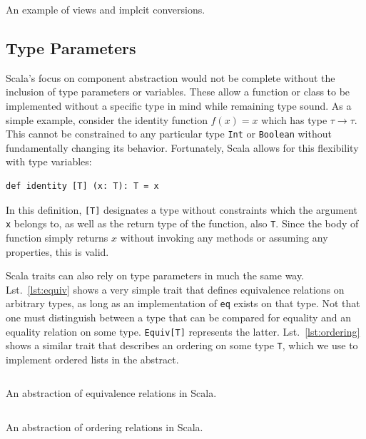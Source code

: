 \documentclass[jou,apacite]{IEEEtran}
\begin{document}
\begin{listing}
  \inputminted[frame=single, firstline=3, lastline=14]{Scala}{../examples/Set.scala}
  \caption{An example of views and implcit conversions.}
  \label{lst:set-example}
\end{listing}

\subsection{Type Parameters}
\label{sec:type-parameters}

Scala's focus on component abstraction would not be complete without the
inclusion of type parameters or variables. These allow a function or class to be
implemented without a specific type in mind while remaining type sound. As a
simple example, consider the identity function $f(x) = x$ which has type
$\tau \rightarrow \tau$. This cannot be constrained to any particular type
\texttt{Int} or \texttt{Boolean} without fundamentally changing its
behavior. Fortunately, Scala allows for this flexibility with type variables:
\begin{verbatim}
def identity [T] (x: T): T = x
\end{verbatim}
In this definition, \texttt{[T]} designates a type without constraints which the
argument \texttt{x} belongs to, as well as the return type of the function, also
\texttt{T}. Since the body of function simply returns $x$ without invoking any
methods or assuming any properties, this is valid.

Scala traits can also rely on type parameters in much the same
way. Lst.~\ref{lst:equiv} shows a very simple trait that defines equivalence
relations on arbitrary types, as long as an implementation of \texttt{eq} exists
on that type. Not that one must distinguish between a type that can be compared
for equality and an equality relation on some type. \texttt{Equiv[T]} represents
the latter. Lst.~\ref{lst:ordering} shows a similar trait that describes
an ordering on some type \texttt{T}, which we use to implement ordered lists in
the abstract.

\begin{listing}
  \inputminted[firstline=3, frame=single]{Scala}{../examples/Equiv.scala} 
  \caption{An abstraction of equivalence relations in Scala.}
  \label{lst:equiv}
\end{listing}

\begin{listing}
  \inputminted[firstline=3, frame=single]{Scala}{../examples/Ord.scala}
  \caption{An abstraction of ordering relations in Scala.}
  \label{lst:ordering}
\end{listing}
\end{document}

